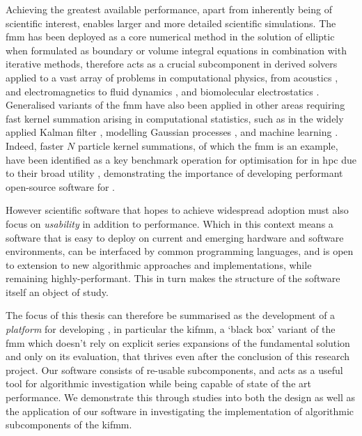 Achieving the greatest available performance, apart from inherently being of scientific interest, enables larger and more detailed scientific simulations. The \acrshort{fmm} has been deployed as a core numerical method in the solution of elliptic  when formulated as boundary or volume integral equations in combination with iterative methods, therefore acts as a crucial subcomponent in derived solvers applied to a vast array of problems in computational physics, from acoustics \cite{hao2015efficient}, and electromagnetics \cite{darve2004fast} to fluid dynamics \cite{darve2004fast}, and biomolecular electrostatics \cite{yokota2011biomolecular, wang2021high}. Generalised variants of the \acrshort{fmm} have also been applied in other areas requiring fast kernel summation arising in computational statistics, such as in the widely applied Kalman filter \cite{li2014kalman}, modelling Gaussian processes \cite{ambikasaran2014fast}, and machine learning \cite{gray2000n, march2017far}. Indeed, faster $N$ particle kernel summations, of which the \acrshort{fmm} is an example, have been identified as a key benchmark operation for optimisation for in \acrshort{hpc} due to their broad utility \cite{asanovic2006landscape}, demonstrating the importance of developing performant open-source software for .

However scientific software that hopes to achieve widespread adoption must also focus on \textit{usability} in addition to performance. Which in this context means a software that is easy to deploy on current and emerging hardware and software environments, can be interfaced by common programming languages, and is open to extension to new algorithmic approaches and implementations, while remaining highly-performant. This in turn makes the structure of the software itself an object of study.

The focus of this thesis can therefore be summarised as the development of a \textit{platform} for developing , in particular the \acrfull{kifmm}, a `black box' variant of the \acrshort{fmm} which doesn't rely on explicit series expansions of the fundamental solution and only on its evaluation, that thrives even after the conclusion of this research project. Our software consists of re-usable subcomponents, and acts as a useful tool for algorithmic investigation while being capable of state of the art performance. We demonstrate this through studies into both the design as well as the application of our software in investigating the implementation of algorithmic subcomponents of the \acrshort{kifmm}.

